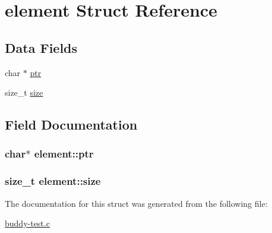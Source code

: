 \hypertarget{structelement}{
\section{element Struct Reference}
\label{structelement}
}
\subsection*{Data Fields}
\begin{DoxyCompactItemize}
\item 
char $\ast$ \hyperlink{structelement_a341f2122078651b4b448b77c839da304}{ptr}
\item 
size\_\-t \hyperlink{structelement_af5f39eb9d176171d49f822f47906e555}{size}
\end{DoxyCompactItemize}


\subsection{Field Documentation}
\hypertarget{structelement_a341f2122078651b4b448b77c839da304}{
\subsubsection[{ptr}]{\setlength{\rightskip}{0pt plus 5cm}char$\ast$ {\bf element::ptr}}}
\label{structelement_a341f2122078651b4b448b77c839da304}
\hypertarget{structelement_af5f39eb9d176171d49f822f47906e555}{
\subsubsection[{size}]{\setlength{\rightskip}{0pt plus 5cm}size\_\-t {\bf element::size}}}
\label{structelement_af5f39eb9d176171d49f822f47906e555}


The documentation for this struct was generated from the following file:\begin{DoxyCompactItemize}
\item 
\hyperlink{buddy-test_8c}{buddy-\/test.c}\end{DoxyCompactItemize}
